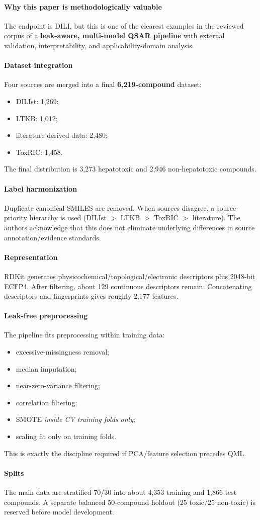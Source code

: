 \documentclass[11pt]{article}
\newcommand{\reviewfield}[2]{\paragraph{#1}#2}
\begin{document}
\reviewfield{Why this paper is methodologically valuable}{
The endpoint is DILI, but this is one of the clearest examples in the reviewed corpus of a \textbf{leak-aware, multi-model QSAR pipeline} with external validation, interpretability, and applicability-domain analysis.
}

\reviewfield{Dataset integration}{
Four sources are merged into a final \textbf{6,219-compound} dataset:
\begin{itemize}
    \item DILIst: 1,269;
    \item LTKB: 1,012;
    \item literature-derived data: 2,480;
    \item ToxRIC: 1,458.
\end{itemize}
The final distribution is 3,273 hepatotoxic and 2,946 non-hepatotoxic compounds.
}

\reviewfield{Label harmonization}{
Duplicate canonical SMILES are removed. When sources disagree, a source-priority hierarchy is used (DILIst $>$ LTKB $>$ ToxRIC $>$ literature). The authors acknowledge that this does not eliminate underlying differences in source annotation/evidence standards.
}

\reviewfield{Representation}{
RDKit generates physicochemical/topological/electronic descriptors plus 2048-bit ECFP4. After filtering, about 129 continuous descriptors remain. Concatenating descriptors and fingerprints gives roughly 2,177 features.
}

\reviewfield{Leak-free preprocessing}{
The pipeline fits preprocessing within training data:
\begin{itemize}
    \item excessive-missingness removal;
    \item median imputation;
    \item near-zero-variance filtering;
    \item correlation filtering;
    \item SMOTE \emph{inside CV training folds only};
    \item scaling fit only on training folds.
\end{itemize}
This is exactly the discipline required if PCA/feature selection precedes QML.
}

\reviewfield{Splits}{
The main data are stratified 70/30 into about 4,353 training and 1,866 test compounds. A separate balanced 50-compound holdout (25 toxic/25 non-toxic) is reserved before model development.
}
\end{document}
